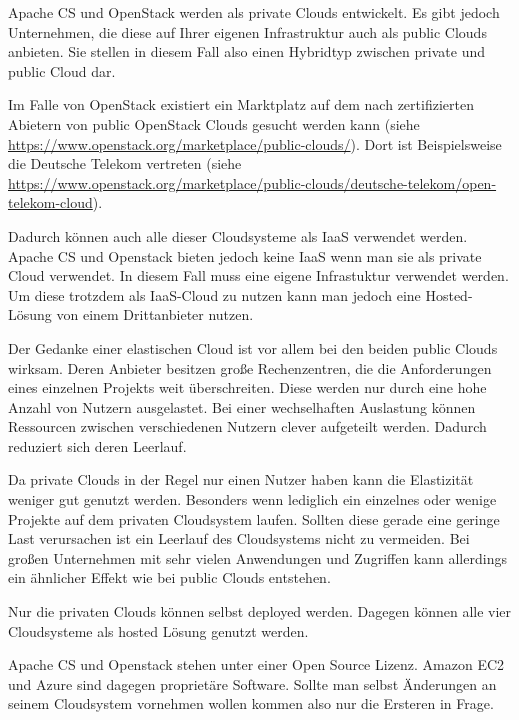 \documentclass[a4paper,10pt]{article}
\numberwithin{figure}{section}
\numberwithin{table}{section}
\begin{document}
Apache CS und OpenStack werden als private Clouds entwickelt.
Es gibt jedoch Unternehmen, die diese auf Ihrer eigenen Infrastruktur auch als public Clouds anbieten.
Sie stellen in diesem Fall also einen Hybridtyp zwischen private und public Cloud dar.

Im Falle von OpenStack existiert ein Marktplatz auf dem nach zertifizierten Abietern von public OpenStack Clouds gesucht werden kann
(siehe \url{https://www.openstack.org/marketplace/public-clouds/}).
Dort ist Beispielsweise die Deutsche Telekom vertreten
(siehe \url{https://www.openstack.org/marketplace/public-clouds/deutsche-telekom/open-telekom-cloud}).

Dadurch können auch alle dieser Cloudsysteme als IaaS verwendet werden.
Apache CS und Openstack bieten jedoch keine IaaS wenn man sie als private Cloud verwendet.
In diesem Fall muss eine eigene Infrastuktur verwendet werden.
Um diese trotzdem als IaaS-Cloud zu nutzen kann man jedoch eine Hosted-Lösung von einem Drittanbieter nutzen.

Der Gedanke einer elastischen Cloud ist vor allem bei den beiden public Clouds wirksam.
Deren Anbieter besitzen große Rechenzentren, die die Anforderungen eines einzelnen Projekts weit überschreiten.
Diese werden nur durch eine hohe Anzahl von Nutzern ausgelastet.
Bei einer wechselhaften Auslastung können Ressourcen zwischen verschiedenen Nutzern clever aufgeteilt werden.
Dadurch reduziert sich deren Leerlauf.

Da private Clouds in der Regel nur einen Nutzer haben kann die Elastizität weniger gut genutzt werden.
Besonders wenn lediglich ein einzelnes oder wenige Projekte auf dem privaten Cloudsystem laufen.
Sollten diese gerade eine geringe Last verursachen ist ein Leerlauf des Cloudsystems nicht zu vermeiden.
Bei großen Unternehmen mit sehr vielen Anwendungen und Zugriffen kann allerdings ein ähnlicher Effekt wie bei public Clouds entstehen.

Nur die privaten Clouds können selbst deployed werden.
Dagegen können alle vier Cloudsysteme als hosted Lösung genutzt werden.

Apache CS und Openstack stehen unter einer Open Source Lizenz.
Amazon EC2 und Azure sind dagegen proprietäre Software.
Sollte man selbst Änderungen an seinem Cloudsystem vornehmen wollen kommen also nur die Ersteren in Frage.

\newpage
\end{document}
